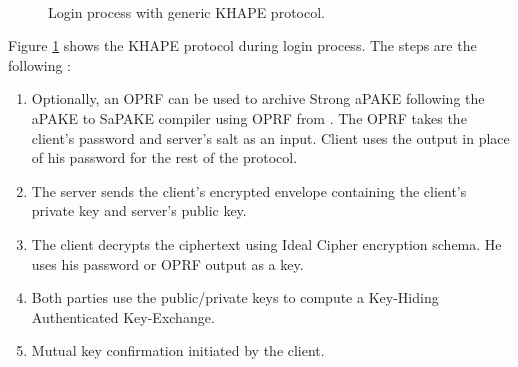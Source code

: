 \documentclass[../report.tex]{subfiles}
\begin{document}






\paragraph{}


\begin{figure}[h]
 \centering
 
 \setlength{\fboxsep}{10pt}
 \setlength{\fboxrule}{1pt}
 
 \caption{Login process with generic KHAPE protocol.}
 \label{fig:Generic_KHAPE}
\end{figure}

Figure \ref{fig:Generic_KHAPE} shows the KHAPE protocol during login process.
The steps are the following :

\begin{enumerate}
 \item Optionally, an OPRF can be used to archive Strong aPAKE following the aPAKE to SaPAKE compiler using OPRF from \cite{OPAQUE_Paper}. The OPRF takes the client's password and server's salt as an input. Client uses the output in place of his password for the rest of the protocol.
 \item The server sends the client's encrypted envelope containing the client's private key and server's public key.
 \item The client decrypts the ciphertext using Ideal Cipher encryption schema. He uses his password or OPRF output as a key.
 \item Both parties use the public/private keys to compute a Key-Hiding Authenticated Key-Exchange.
 \item Mutual key confirmation initiated by the client.
\end{enumerate}
\end{document}
